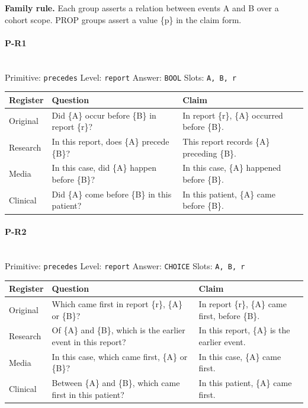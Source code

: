 \documentclass[11pt]{article}
\begin{document}
\noindent\textbf{Family rule.} Each group asserts a relation between events A and B over a cohort scope.
PROP groups assert a value \{p\} in the claim form.

\paragraph{\textbf{P-R1}}\mbox{}\\
Primitive: \texttt{precedes} \quad Level: \texttt{report} \quad Answer: \texttt{BOOL} \quad Slots: \texttt{A, B, r}\\[2pt]
\begin{tabularx}{\linewidth}{@{}l L L@{}}
\toprule
\textbf{Register} & \textbf{Question} & \textbf{Claim} \\
\midrule
Original & Did \{A\} occur before \{B\} in report \{r\}? & In report \{r\}, \{A\} occurred before \{B\}. \\
Research & In this report, does \{A\} precede \{B\}? & This report records \{A\} preceding \{B\}. \\
Media & In this case, did \{A\} happen before \{B\}? & In this case, \{A\} happened before \{B\}. \\
Clinical & Did \{A\} come before \{B\} in this patient? & In this patient, \{A\} came before \{B\}. \\
\bottomrule
\end{tabularx}
\vspace{4pt}

\paragraph{\textbf{P-R2}}\mbox{}\\
Primitive: \texttt{precedes} \quad Level: \texttt{report} \quad Answer: \texttt{CHOICE} \quad Slots: \texttt{A, B, r}\\[2pt]
\begin{tabularx}{\linewidth}{@{}l L L@{}}
\toprule
\textbf{Register} & \textbf{Question} & \textbf{Claim} \\
\midrule
Original & Which came first in report \{r\}, \{A\} or \{B\}? & In report \{r\}, \{A\} came first, before \{B\}. \\
Research & Of \{A\} and \{B\}, which is the earlier event in this report? & In this report, \{A\} is the earlier event. \\
Media & In this case, which came first, \{A\} or \{B\}? & In this case, \{A\} came first. \\
Clinical & Between \{A\} and \{B\}, which came first in this patient? & In this patient, \{A\} came first. \\
\bottomrule
\end{tabularx}
\vspace{4pt}
\end{document}
